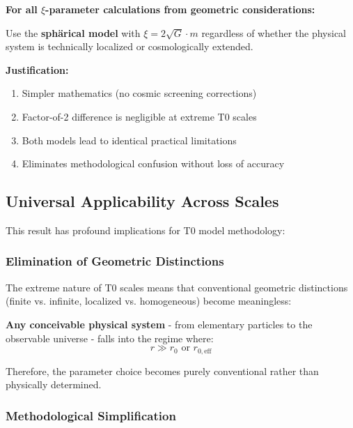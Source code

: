 \documentclass[12pt,a4paper]{article}
\begin{document}
\begin{tcolorbox}[colback=green!5!white,colframe=green!75!black,title=Practical Recommendation]
	\textbf{For all $\xi$-parameter calculations from geometric considerations:}
	
	Use the \textbf{sphärical model} with $\xi = 2\sqrt{G} \cdot m$ regardless of whether the physical system is technically localized or cosmologically extended.
	
	\textbf{Justification:}
	\begin{enumerate}
		\item Simpler mathematics (no cosmic screening corrections)
		\item Factor-of-2 difference is negligible at extreme T0 scales  
		\item Both models lead to identical practical limitations
		\item Eliminates methodological confusion without loss of accuracy
	\end{enumerate}
\end{tcolorbox}

\subsection{Universal Applicability Across Scales}
\label{subsec:universal_applicability}

This result has profound implications for T0 model methodology:

\subsubsection{Elimination of Geometric Distinctions}
\label{subsubsec:geometric_distinctions}

The extreme nature of T0 scales means that conventional geometric distinctions (finite vs. infinite, localized vs. homogeneous) become meaningless:

\textbf{Any conceivable physical system} - from elementary particles to the observable universe - falls into the regime where:
\begin{equation}
	r \gg r_0 \text{ or } r_{0,\text{eff}}
\end{equation}

Therefore, the parameter choice becomes purely conventional rather than physically determined.

\subsubsection{Methodological Simplification}
\label{subsubsec:methodological_simplification}
\end{document}
